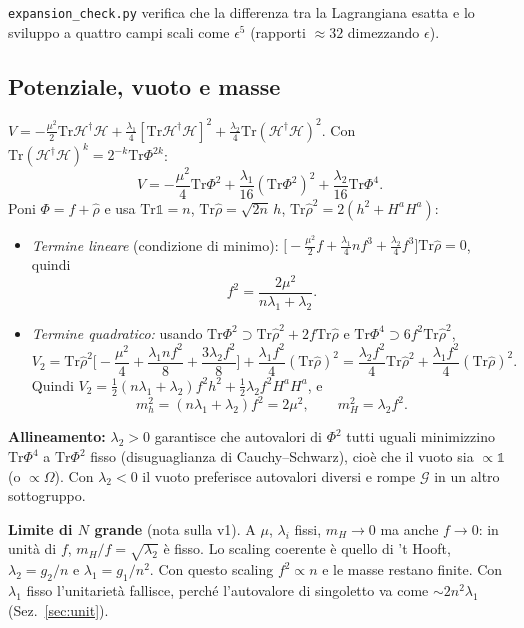 \documentclass[11pt,a4paper]{article}
\numberwithin{equation}{section}
\theoremstyle{remark}
\newcommand{\Tr}{\mathrm{Tr}}
\newcommand{\Hf}{\mathcal{H}}
\newcommand{\G}{\mathcal{G}}
\newcommand{\one}{\mathbb{1}}
\begin{document}
\begin{verifica}
\texttt{expansion\_check.py} verifica che la differenza tra la Lagrangiana esatta e lo sviluppo a quattro campi scali come $\epsilon^5$ (rapporti $\approx32$ dimezzando $\epsilon$).
\end{verifica}

\subsection{Potenziale, vuoto e masse}

$V=-\frac{\mu^2}{2}\Tr\Hf^\dagger\Hf+\frac{\lambda_1}4[\Tr\Hf^\dagger\Hf]^2+\frac{\lambda_2}{4}\Tr(\Hf^\dagger\Hf)^2$. Con $\Tr(\Hf^\dagger\Hf)^k=2^{-k}\Tr\Phi^{2k}$:
\[
V=-\frac{\mu^2}{4}\Tr\Phi^2+\frac{\lambda_1}{16}(\Tr\Phi^2)^2+\frac{\lambda_2}{16}\Tr\Phi^4 .
\]
Poni $\Phi=f+\hat\rho$ e usa $\Tr\one=n$, $\Tr\hat\rho=\sqrt{2n}\,h$, $\Tr\hat\rho^2=2(h^2+H^aH^a)$:
\begin{itemize}
\item \emph{Termine lineare} (condizione di minimo): $\big[-\frac{\mu^2}{2}f+\frac{\lambda_1}{4}nf^3+\frac{\lambda_2}{4}f^3\big]\Tr\hat\rho=0$, quindi
\[
f^2=\frac{2\mu^2}{n\lambda_1+\lambda_2}.
\]
\item \emph{Termine quadratico:} usando $\Tr\Phi^2\supset\Tr\hat\rho^2+2f\Tr\hat\rho$ e $\Tr\Phi^4\supset6f^2\Tr\hat\rho^2$,
\[
V_2=\Tr\hat\rho^2\Big[-\frac{\mu^2}4+\frac{\lambda_1nf^2}{8}+\frac{3\lambda_2f^2}{8}\Big]+\frac{\lambda_1f^2}{4}(\Tr\hat\rho)^2=\frac{\lambda_2f^2}{4}\Tr\hat\rho^2+\frac{\lambda_1f^2}{4}(\Tr\hat\rho)^2 .
\]
Quindi $V_2=\frac12(n\lambda_1+\lambda_2)f^2h^2+\frac12\lambda_2f^2H^aH^a$, e
\begin{equation}
\boxed{m_h^2=(n\lambda_1+\lambda_2)f^2=2\mu^2,\qquad m_H^2=\lambda_2f^2.}
\end{equation}
\end{itemize}
\textbf{Allineamento:} $\lambda_2>0$ garantisce che autovalori di $\Phi^2$ tutti uguali minimizzino $\Tr\Phi^4$ a $\Tr\Phi^2$ fisso (disuguaglianza di Cauchy--Schwarz), cioè che il vuoto sia $\propto\one$ (o $\propto\Omega$). Con $\lambda_2<0$ il vuoto preferisce autovalori diversi e rompe $\G$ in un altro sottogruppo.

\textbf{Limite di $N$ grande} (nota sulla v1). A $\mu$, $\lambda_i$ fissi, $m_H\to0$ ma anche $f\to0$: in unità di $f$, $m_H/f=\sqrt{\lambda_2}$ è fisso. Lo scaling coerente è quello di 't Hooft, $\lambda_2=g_2/n$ e $\lambda_1=g_1/n^2$. Con questo scaling $f^2\propto n$ e le masse restano finite. Con $\lambda_1$ fisso l'unitarietà fallisce, perché l'autovalore di singoletto va come $\sim2n^2\lambda_1$ (Sez.~\ref{sec:unit}).
\end{document}
